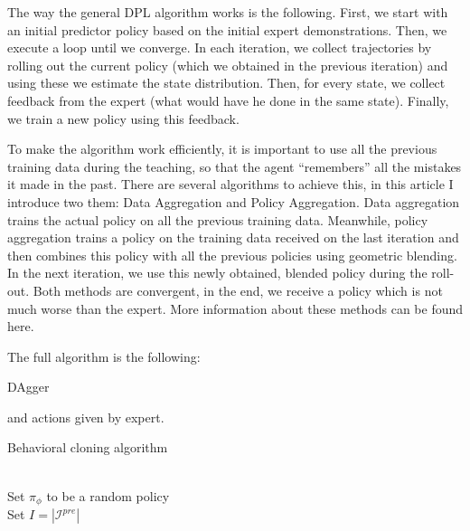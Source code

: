 \documentclass{article}
\begin{document}
The way the general DPL algorithm works is the following. First, we start with an initial predictor policy based on the initial expert demonstrations. Then, we execute a loop until we converge. In each iteration, we collect trajectories by rolling out the current policy (which we obtained in the previous iteration) and using these we estimate the state distribution. Then, for every state, we collect feedback from the expert (what would have he done in the same state). Finally, we train a new policy using this feedback.

To make the algorithm work efficiently, it is important to use all the previous training data during the teaching, so that the agent “remembers” all the mistakes it made in the past. There are several algorithms to achieve this, in this article I introduce two them: Data Aggregation and Policy Aggregation. Data aggregation trains the actual policy on all the previous training data. Meanwhile, policy aggregation trains a policy on the training data received on the last iteration and then combines this policy with all the previous policies using geometric blending. In the next iteration, we use this newly obtained, blended policy during the roll-out. Both methods are convergent, in the end, we receive a policy which is not much worse than the expert. More information about these methods can be found here.

The full algorithm is the following:



\begin{algorithm}
\onehalfspacing
\caption{DAgger} 
\begin{algorithmic}[1]
and actions given by expert.
                \\
            \EndFor 
\end{algorithmic} 
\end{algorithm}

\begin{algorithm}
\caption{Behavioral cloning algorithm}\label{algo:BC}
\begin{algorithmic}[1]
\\
Set {$\pi_\phi$ to be a random policy}\\
Set {$I = |\mathcal{I}^{pre}| $}
    
\end{algorithmic}
\end{algorithm}
\end{document}
